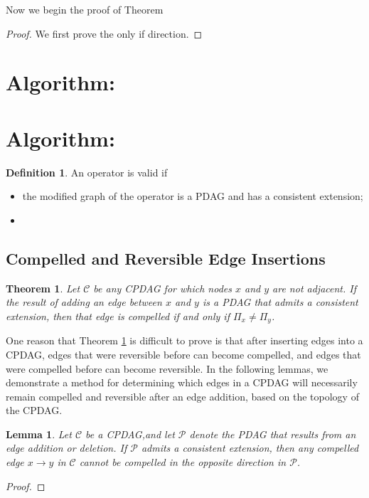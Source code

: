 \documentclass{article}
\newtheorem{theorem}{Theorem}[section]
\newtheorem{lemma}{Lemma}[section]
\theoremstyle{definition}
\newtheorem{definition}{Definition}[section]
\newcommand{\cC}{\mathcal{C}}
\newcommand{\cP}{\mathcal{P}}
\newcommand{\<}{\left\langle}
\renewcommand{\>}{\right\rangle}
\begin{document}
Now we begin the proof of Theorem 
\begin{proof}
    We first prove the only if direction.
\end{proof}



\section{Algorithm: }


\section{Algorithm: }

\begin{definition}
    An operator is valid if
    \begin{itemize}
        \item the modified graph of the operator is a PDAG and has a consistent extension;
        \item 
    \end{itemize}
\end{definition}

\subsection{Compelled and Reversible Edge Insertions}
\begin{theorem}\label{thm:0.7.1}
    Let $\cC$ be any CPDAG for which nodes $x$ and $y$ are not adjacent. If the result of adding an edge between $x$ and $y$ is a PDAG that admits a consistent extension, then that edge is compelled if and only if $\Pi_x \neq \Pi_y$.
\end{theorem}
One reason that Theorem \ref*{thm:0.7.1} is difficult to prove is that after inserting edges into a CPDAG, edges that were reversible before can become compelled, and edges that were compelled before can become reversible.
In the following lemmas, we demonstrate a method for determining which edges in a CPDAG will necessarily remain compelled and reversible after an edge addition, based on the topology of the CPDAG.

\begin{lemma}
    Let $\cC$ be a CPDAG,and let $\cP$ denote the PDAG that results from an edge addition or deletion. If $\cP$ admits a consistent extension, then any compelled edge $x \rightarrow y$ in $\cC$ cannot be compelled in the opposite direction in $\cP$.
\end{lemma}
\begin{proof}
    
\end{proof}
\end{document}
